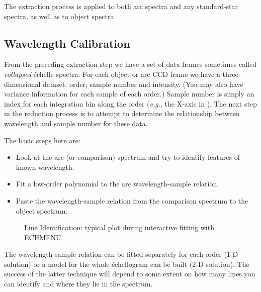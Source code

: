 The extraction process is applied to both arc spectra and any
standard-star spectra, as well as to object spectra.


\subsection{\label{se_wavelen_cal}Wavelength Calibration}

From the preceding extraction step we have a set of data frames
sometimes called {\sl collapsed} \'{e}chelle spectra.  For each object
or arc CCD frame we have a three-dimensional dataset: order, sample
number and intensity.  (You may also have variance information for each
sample of each order.)  Sample number is simply an index for each
integration bin along the order ({\em{e.g.}}, the X-axis in
).
The next step in the reduction process is to attempt to determine the
relationship between wavelength and sample number for these data.

The basic steps here are:

\begin{itemize}

\item Look at the arc (or comparison) spectrum and try to identify
      features of known wavelength.

\item Fit a low-order polynomial to the arc wavelength-sample relation.

\item Paste the wavelength-sample relation from the comparison spectrum
      to the object spectrum.

\end{itemize}

\begin{figure}
\begin{center}
{\leavevmode\epsfysize=136mm}

\parbox{140mm}{
\caption{Line Identification: typical plot during interactive fitting
         with ECHMENU.}
\label{fi_echarc_plot}
}
\end{center}
\end{figure}

The wavelength-sample relation can be fitted separately for each order
(1-D solution) or a model for the whole \'{e}chellogram can be built
(2-D solution)\@.  The success of the latter technique will depend to
some extent on how many lines you can identify and where they lie in
the spectrum.

